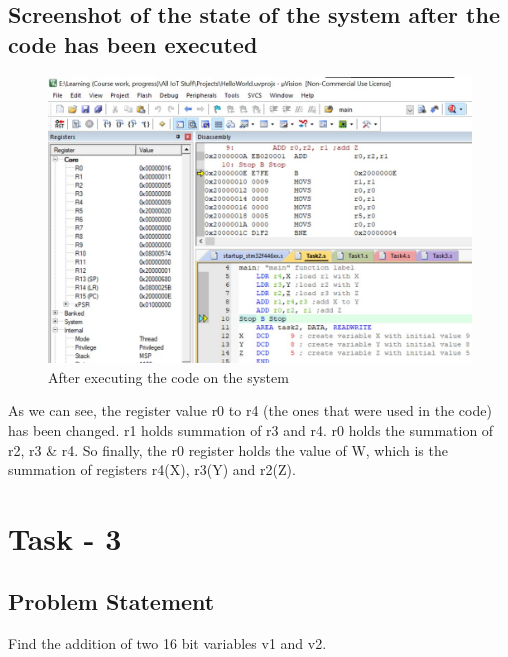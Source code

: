 \documentclass[footheight=20pt, footsepline, headheight=20pt, headsepline]{scrartcl}
\begin{document}
\subsection*{Screenshot of the state of the system after the code has been executed}
\begin{figure}[ht]
    \centering
    \includegraphics[scale=.75]{images/Task2After1.jpg}
    \caption{After executing the code on the system}
    \label{fig:after_task_two}
\end{figure}
\FloatBarrier
As we can see, the register value r0 to r4 (the ones that were used in the code) has been changed. r1 holds summation of r3 and r4. r0 holds the summation of r2, r3 \& r4. So finally, the r0 register holds the value of W, which is the summation of registers r4(X), r3(Y) and r2(Z).

\newpage
\FloatBarrier
\section*{Task - 3}
\subsection*{Problem Statement}
Find the addition of two 16 bit variables v1 and v2.
\end{document}
